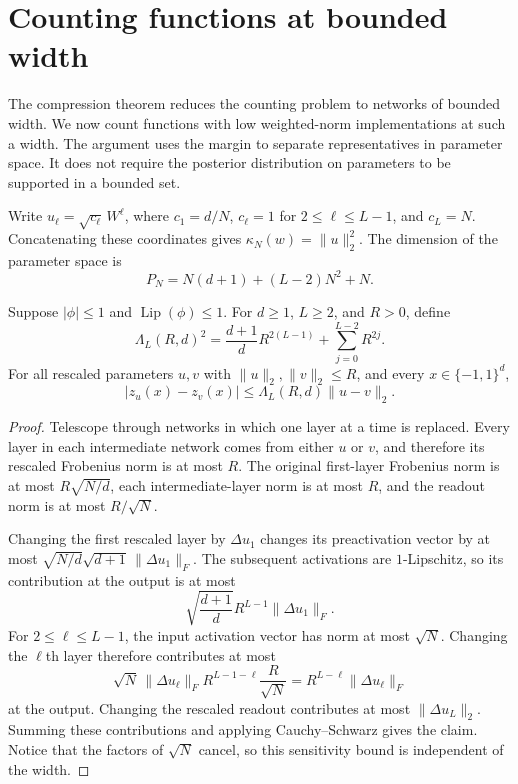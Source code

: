 \section{Counting functions at bounded width}
\label{sec:packing}

The compression theorem reduces the counting problem to networks of bounded
width. We now count functions with low weighted-norm implementations at such
a width.
The argument uses the margin to separate representatives in parameter space.
It does not require the posterior distribution on parameters to be supported
in a bounded set.

Write $u_\ell=\sqrt{c_\ell}\,W^\ell$, where
$c_1=d/N$, $c_\ell=1$ for $2\leq\ell\leq L-1$, and $c_L=N$.
Concatenating these coordinates gives $\kappa_N(w)=\|u\|_2^2$.
The dimension of the parameter space is
\[
 P_N=N(d+1)+(L-2)N^2+N.
\]

\begin{lemma}
\label{lem:parameter-sensitivity}
Suppose $|\phi|\leq1$ and $\operatorname{Lip}(\phi)\leq1$.
For $d\geq1$, $L\geq2$, and $R>0$, define
\[
 \Lambda_L(R,d)^2
 =\frac{d+1}{d}R^{2(L-1)}+\sum_{j=0}^{L-2}R^{2j}.
\]
For all rescaled parameters $u,v$ with $\|u\|_2,\|v\|_2\leq R$,
and every $x\in\{-1,1\}^d$,
\[
 |z_u(x)-z_v(x)|\leq\Lambda_L(R,d)\|u-v\|_2.
\]
\end{lemma}

\begin{proof}
Telescope through networks in which one layer at a time is replaced.
Every layer in each intermediate network comes from either $u$ or $v$,
and therefore its rescaled Frobenius norm is at most $R$.
The original first-layer Frobenius norm is at most $R\sqrt{N/d}$,
each intermediate-layer norm is at most $R$, and the readout norm is
at most $R/\sqrt N$.

Changing the first rescaled layer by $\Delta u_1$ changes its
preactivation vector by at most
$\sqrt{N/d}\sqrt{d+1}\,\|\Delta u_1\|_F$.
The subsequent activations are $1$-Lipschitz, so its contribution at the
output is at most
\[
 \sqrt{\frac{d+1}{d}}R^{L-1}\|\Delta u_1\|_F.
\]
For $2\leq\ell\leq L-1$, the input activation vector has norm at most
$\sqrt N$. Changing the $\ell$th layer therefore contributes at most
\[
 \sqrt N\,\|\Delta u_\ell\|_F
 R^{L-1-\ell}\frac{R}{\sqrt N}
 =R^{L-\ell}\|\Delta u_\ell\|_F
\]
at the output. Changing the rescaled readout contributes at most
$\|\Delta u_L\|_2$. Summing these contributions and applying
Cauchy--Schwarz gives the claim. Notice that the factors of $\sqrt N$
cancel, so this sensitivity bound is independent of the width.
\end{proof}

